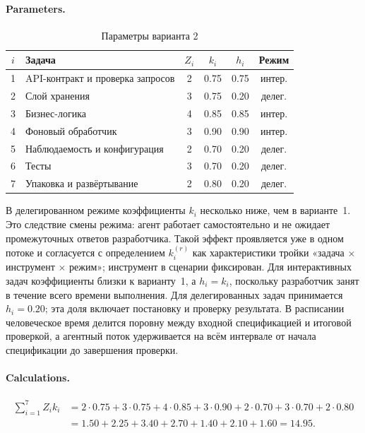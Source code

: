\documentclass[12pt,a4paper]{article}
\theoremstyle{definition}
\begin{document}
\paragraph{Parameters.}
\begin{table}[ht!]
\centering
\caption{Параметры варианта 2}
\label{tab:practical-v2-params}
\begin{tabular}{clcccc}
\toprule
$i$ & Задача & $Z_i$ & $k_i$ & $h_i$ & Режим \\
\midrule
1 & API-контракт и проверка запросов & 2 & 0.75 & 0.75 & интер. \\
2 & Слой хранения & 3 & 0.75 & 0.20 & делег. \\
3 & Бизнес-логика & 4 & 0.85 & 0.85 & интер. \\
4 & Фоновый обработчик & 3 & 0.90 & 0.90 & интер. \\
5 & Наблюдаемость и конфигурация & 2 & 0.70 & 0.20 & делег. \\
6 & Тесты & 3 & 0.70 & 0.20 & делег. \\
7 & Упаковка и развёртывание & 2 & 0.80 & 0.20 & делег. \\
\bottomrule
\end{tabular}
\end{table}

В делегированном режиме коэффициенты $k_i$ несколько ниже, чем в варианте~1. Это следствие смены режима: агент работает самостоятельно и не ожидает промежуточных ответов разработчика. Такой эффект проявляется уже в одном потоке и согласуется с определением $k_i^{(r)}$ как характеристики тройки «задача $\times$ инструмент $\times$ режим»; инструмент в сценарии фиксирован. Для интерактивных задач коэффициенты близки к варианту~1, а $h_i = k_i$, поскольку разработчик занят в течение всего времени выполнения. Для делегированных задач принимается $h_i = 0.20$; эта доля включает постановку и проверку результата. В расписании человеческое время делится поровну между входной спецификацией и итоговой проверкой, а агентный поток удерживается на всём интервале от начала спецификации до завершения проверки.

\paragraph{Calculations.}
\begin{align*}
  \sum_{i=1}^{7} Z_i k_i &= 2{\cdot}0.75 + 3{\cdot}0.75 + 4{\cdot}0.85 + 3{\cdot}0.90 + 2{\cdot}0.70 + 3{\cdot}0.70 + 2{\cdot}0.80 \\
  &= 1.50 + 2.25 + 3.40 + 2.70 + 1.40 + 2.10 + 1.60 = 14.95.
\end{align*}
\end{document}
